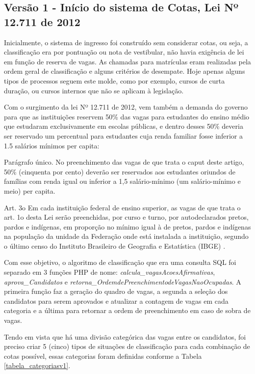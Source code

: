 \subsection{Versão 1 - Início do sistema de Cotas, Lei Nº 12.711 de 2012}
\label{versao1}

Inicialmente, o sistema de ingresso foi construído sem considerar cotas, ou seja, a classificação era por pontuação ou nota de vestibular, não havia exigência de lei em função de reserva de vagas. As chamadas para matrículas eram realizadas pela ordem geral de classificação e alguns critérios de desempate. Hoje apenas alguns tipos de processos seguem este molde, como por exemplo, cursos de curta duração, ou cursos internos que não se aplicam à legislação.

Com o surgimento da lei Nº 12.711 de 2012, vem também a demanda do governo para que as instituições reservem 50\% das vagas para estudantes do ensino médio que estudaram exclusivamente em escolas públicas, e dentro desses 50\% deveria ser reservado um percentual para estudantes cuja renda familiar fosse inferior a 1.5 salários mínimos per capita:

\begin{citacao}
Parágrafo único.  No preenchimento das vagas de que trata o caput deste artigo, 50\% (cinquenta por cento) deverão ser reservados aos estudantes oriundos de famílias com renda igual ou inferior a 1,5 salário-mínimo (um salário-mínimo e meio) per capita.

Art. 3o  Em cada instituição federal de ensino superior, as vagas de que trata o art. 1o desta Lei serão preenchidas, por curso e turno, por autodeclarados pretos, pardos e indígenas, em proporção no mínimo igual à de pretos, pardos e indígenas na população da unidade da Federação onde está instalada a instituição, segundo o último censo do Instituto Brasileiro de Geografia e Estatística (IBGE) \cite{leicotas}.
\end{citacao}

Com esse objetivo, o algoritmo de classificação que era uma consulta SQL foi separado em 3 funções PHP de nome: \textit{calcula\_vagasAcoesAfirmativas}, \textit{aprova\_Candidatos} e \textit{retorna\_OrdemdePreenchimentodeVagasNaoOcupadas}.  A primeira função faz a geração do quadro de vagas, a segunda a seleção dos candidatos para serem aprovados e atualizar a contagem de vagas em cada categoria e a última para retornar a ordem de preenchimento em caso de sobra de vagas.

Tendo em vista que há uma divisão categórica das vagas entre os candidatos, foi preciso criar 5 (cinco) tipos de situações de classificação para cada combinação de cotas possível, essas categorias foram definidas conforme a Tabela \ref{tabela_categoriasv1}.


